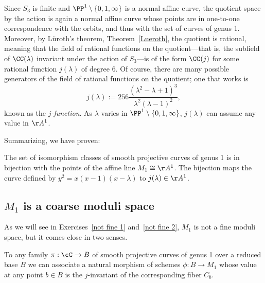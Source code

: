 Since $S_3$ is finite and $\PP^1 \setminus \{0,1,\infty\}$ is a normal affine curve, the quotient space by the action is again a normal affine curve whose points are in one-to-one
correspondence with the orbits, and thus with the set of curves of genus 1. 
 Moreover, by L\"uroth's theorem, Theorem~\ref{Lueroth}, the quotient is rational, meaning that the field of rational functions on the quotient---that is, the subfield of $\CC(\lambda)$ invariant under the action of $S_3$---is of the form $\CC(j)$ for some rational function $j(\lambda)$ of degree 6. Of course, there are many possible generators of the field of rational functions on the quotient; one that works is
\begin{equation}\label{formula for j}
j(\lambda) := 256\frac{(\lambda^2-\lambda + 1)^3}{\lambda^2(\lambda-1)^2},
\end{equation}
known as the \emph{$j$-function}. As $\lambda$ varies in $\PP^1 \setminus \{0,1,\infty\}$, $j(\lambda)$ can assume any value in $\AA^1$.
 
 

Summarizing, we have proven:

\begin{theorem}
The set of isomorphism classes of smooth projective curves of genus 1 is in bijection with the points of the affine line $M_1 \cong \AA^1$. The bijection maps the curve defined by $y^2 = x(x-1)(x-\lambda)$
to  $j(\lambda)\in \AA^1$.
\end{theorem}

\subsection{$M_1$ is a coarse moduli space}

 As we will see in Exercises~\ref{not fine 1} and~\ref{not fine 2},
$M_1$ is not a fine moduli space, but it comes close in two senses. 

\begin{proposition}\label{M1 is coarse}
To any family $\pi : \cC \to B$  of smooth projective curves of genus 1 over a reduced base $B$ we can associate a natural morphism of schemes $\phi : B \to M_1$ whose value at any point $b \in B$ is the $j$-invariant of the corresponding fiber $C_b$.
\end{proposition} 

